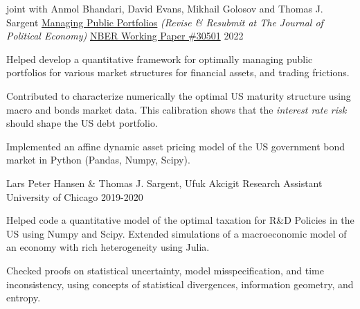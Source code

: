 

\begin{cventries}
	\cventry
	{joint with Anmol Bhandari, David Evans, Mikhail Golosov and Thomas J. Sargent} %
	{\href{https://static1.squarespace.com/static/54c19f18e4b0ef5f4b9f8dae/t/6328ee5213a65c43a48423f8/1663626851912/abegs4draft.pdf}{Managing Public Portfolios} \textit{(Revise \& Resubmit at The Journal of Political Economy)}}  %
	{\href{https://www.nber.org/papers/w30501}{NBER Working Paper \#30501}} %
	{2022} %
	{\begin{cvitems}
			\item Helped develop a quantitative framework for optimally managing public portfolios for various market structures for financial assets, and trading frictions.
			\item Contributed to characterize numerically the optimal US maturity structure using macro and bonds market data. This calibration shows that the \textit{interest rate risk} should shape the US debt portfolio.
			\item Implemented an affine dynamic asset pricing model of the US government bond market in Python (Pandas, Numpy, Scipy).
		\end{cvitems}}

	\cventry
	{Lars Peter Hansen \& Thomas J. Sargent, Ufuk Akcigit}
	{Research Assistant}
	{University of Chicago}
	{2019-2020}
	{\begin{cvitems}
			\item Helped code a quantitative model of the optimal taxation for R\&D Policies in the US using Numpy and Scipy. Extended simulations of a macroeconomic model of an economy with rich heterogeneity using Julia.
			\item Checked proofs on statistical uncertainty, model misspecification, and time inconsistency, using concepts of statistical divergences, information geometry, and entropy.
		\end{cvitems}
	}
\end{cventries}
